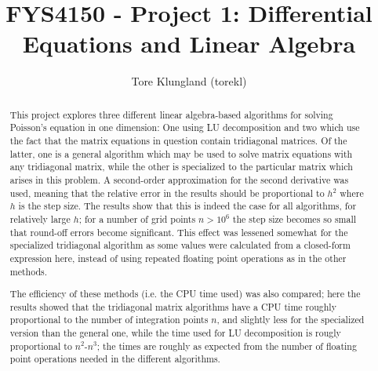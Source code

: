 \documentclass[a4paper,english]{article}
\title{FYS4150 - Project 1: Differential Equations and Linear Algebra}
\author{Tore Klungland (torekl)}
\begin{document}
\maketitle
\begin{abstract}
  This project explores three different linear algebra-based algorithms for solving Poisson's equation in one dimension: One using LU decomposition and two which use the fact that the matrix equations in question contain tridiagonal matrices. Of the latter, one is a general algorithm which may be used to solve matrix equations with any tridiagonal matrix, while the other is specialized to the particular matrix which arises in this problem. A second-order approximation for the second derivative was used, meaning that the relative error in the results should be proportional to $h^2$ where $h$ is the step size. The results show that this is indeed the case for all algorithms, for relatively large $h$; for a number of grid points $n>10^6$ the step size becomes so small that round-off errors become significant. This effect was lessened somewhat for the specialized tridiagonal algorithm as some values were calculated from a closed-form expression here, instead of using repeated floating point operations as in the other methods. \par
  The efficiency of these methods (i.e. the CPU time used) was also compared; here the results showed that the tridiagonal matrix algorithms have a CPU time roughly proportional to the number of integration points $n$, and slightly less for the specialized version than the general one, while the time used for LU decomposition is rougly proportional to $n^2$-$n^3$; the times are roughly as expected from the number of floating point operations needed in the different algorithms.
\end{abstract}
\end{document}
